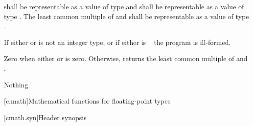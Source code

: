 \begin{itemdescr}
\pnum
\requires
{} shall be representable as a value of type  and
 shall be representable as a value of type .
The least common multiple of  and 
shall be representable as a value of type .

\pnum
\remarks
If either  or  is not an integer type, or
if either is \cv{}~ the program is ill-formed.

\pnum
\returns
Zero when either  or  is zero.
Otherwise, returns the least common multiple of  and .

\pnum
\throws
Nothing.
\end{itemdescr}


[c.math]{Mathematical functions for floating-point types}

[cmath.syn]{Header  synopsis}

